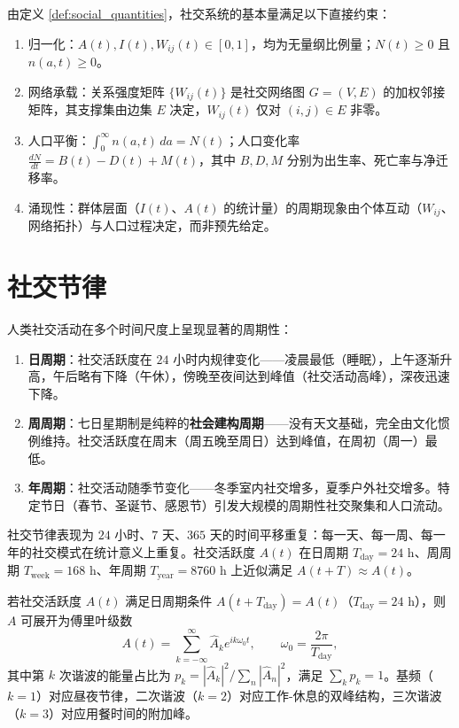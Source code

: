 \begin{property}[基本量的直接约束]\label{ch27_basic_constraints}
由定义 \ref{def:social_quantities}，社交系统的基本量满足以下直接约束：
\begin{enumerate}[label=(\roman*)]
    \item 归一化：$A(t), I(t), W_{ij}(t) \in [0,1]$，均为无量纲比例量；$N(t) \ge 0$ 且 $n(a, t) \ge 0$。
    \item 网络承载：关系强度矩阵 $\{W_{ij}(t)\}$ 是社交网络图 $G=(V,E)$ 的加权邻接矩阵，其支撑集由边集 $E$ 决定，$W_{ij}(t)$ 仅对 $(i,j) \in E$ 非零。
    \item 人口平衡：$\int_0^\infty n(a,t)\, da = N(t)$；人口变化率 $\frac{dN}{dt} = B(t) - D(t) + M(t)$，其中 $B, D, M$ 分别为出生率、死亡率与净迁移率。
    \item 涌现性：群体层面（$I(t)$、$A(t)$ 的统计量）的周期现象由个体互动（$W_{ij}$、网络拓扑）与人口过程决定，而非预先给定。
\end{enumerate}
\end{property}

\section{社交节律}

\begin{definition}[社交活动的多尺度周期]\label{def:social_rhythms}
人类社交活动在多个时间尺度上呈现显著的周期性：
\begin{enumerate}[label=(\roman*)]
    \item \textbf{日周期}：社交活跃度在 $24$ 小时内规律变化——凌晨最低（睡眠），上午逐渐升高，午后略有下降（午休），傍晚至夜间达到峰值（社交活动高峰），深夜迅速下降。
    \item \textbf{周周期}：七日星期制是纯粹的\textbf{社会建构周期}——没有天文基础，完全由文化惯例维持。社交活跃度在周末（周五晚至周日）达到峰值，在周初（周一）最低。
    \item \textbf{年周期}：社交活动随季节变化——冬季室内社交增多，夏季户外社交增多。特定节日（春节、圣诞节、感恩节）引发大规模的周期性社交聚集和人口流动。
\end{enumerate}
社交节律表现为 $24$ 小时、$7$ 天、$365$ 天的时间平移重复：每一天、每一周、每一年的社交模式在统计意义上重复。社交活跃度 $A(t)$ 在日周期 $T_{\text{day}}=24$ h、周周期 $T_{\text{week}}=168$ h、年周期 $T_{\text{year}}=8760$ h 上近似满足 $A(t+T) \approx A(t)$。
\end{definition}

\begin{proposition}[社交活跃度的周期分解]\label{ch27_rhythm_fourier}
若社交活跃度 $A(t)$ 满足日周期条件 $A(t+T_{\text{day}})=A(t)$（$T_{\text{day}}=24$ h），则 $A$ 可展开为傅里叶级数
\[
A(t) = \sum_{k=-\infty}^{\infty} \hat{A}_k e^{i k \omega_0 t}, \qquad \omega_0 = \frac{2\pi}{T_{\text{day}}},
\]
其中第 $k$ 次谐波的能量占比为 $p_k = |\hat{A}_k|^2 / \sum_{n} |\hat{A}_n|^2$，满足 $\sum_k p_k = 1$。基频（$k=1$）对应昼夜节律，二次谐波（$k=2$）对应工作-休息的双峰结构，三次谐波（$k=3$）对应用餐时间的附加峰。
\end{proposition}

